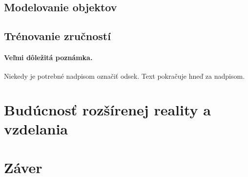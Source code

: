 \documentclass[10pt,twoside,slovak,a4paper]{article}
\begin{document}
\subsection{Modelovanie objektov} \label{rozsirenaVzdelanie:modelovanie}

\subsection{Trénovanie zručností} \label{rozsirenaVzdelanie:zrucnosti}

\paragraph{Veľmi dôležitá poznámka.}
Niekedy je potrebné nadpisom označiť odsek. Text pokračuje hneď za nadpisom.



\section{Budúcnosť rozšírenej reality a vzdelania} \label{rozsirenaBuducnost}


\section{Záver} \label{zaver} %






\end{document}
